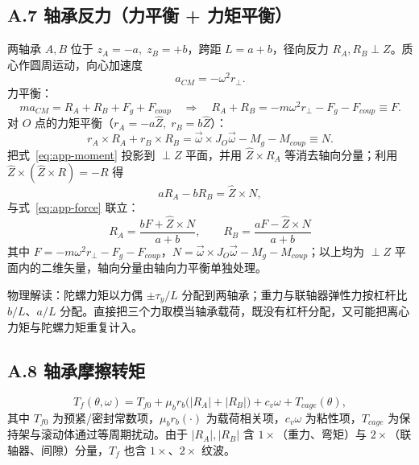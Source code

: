 \subsection*{A.7 轴承反力（力平衡 + 力矩平衡）}

两轴承 $A,B$ 位于 $z_A=-a,\;z_B=+b$，跨距 $L=a+b$，径向反力 $R_A,R_B\perp Z$。质心作圆周运动，向心加速度
\begin{equation}
a_{CM}=-\omega^2r_\perp .
\end{equation}
力平衡：
\begin{equation}
m a_{CM}=R_A+R_B+F_g+F_{coup}
\quad\Longrightarrow\quad
R_A+R_B=-m\omega^2r_\perp-F_g-F_{coup}\equiv F .
\label{eq:app-force}
\end{equation}
对 $O$ 点的力矩平衡（$r_A=-a\hat Z,\;r_B=b\hat Z$）：
\begin{equation}
r_A\times R_A+r_B\times R_B
=\vec\omega\times J_O\vec\omega-M_g-M_{coup}\equiv N .
\label{eq:app-moment}
\end{equation}
把式~\eqref{eq:app-moment} 投影到 $\perp Z$ 平面，并用 $\hat Z\times R_A$ 等消去轴向分量；利用 $\hat Z\times(\hat Z\times R)=-R$ 得
\begin{equation}
aR_A-bR_B=\hat Z\times N ,
\end{equation}
与式~\eqref{eq:app-force} 联立：
\begin{equation}
\boxed{\;R_A=\frac{bF+\hat Z\times N}{a+b},\qquad
R_B=\frac{aF-\hat Z\times N}{a+b}\;}
\label{eq:app-RA}
\end{equation}
其中 $F=-m\omega^2r_\perp-F_g-F_{coup}$，$N=\vec\omega\times J_O\vec\omega-M_g-M_{coup}$；以上均为 $\perp Z$ 平面内的二维矢量，轴向分量由轴向力平衡单独处理。

物理解读：陀螺力矩以力偶 $\pm\tau_y/L$ 分配到两轴承；重力与联轴器弹性力按杠杆比 $b/L$、$a/L$ 分配。直接把三个力取模当轴承载荷，既没有杠杆分配，又可能把离心力矩与陀螺力矩重复计入。

\subsection*{A.8 轴承摩擦转矩}

\begin{equation}
T_f(\theta,\omega)=T_{f0}+\mu_b r_b\bigl(|R_A|+|R_B|\bigr)+c_v\omega+T_{cage}(\theta),
\label{eq:app-Tf}
\end{equation}
其中 $T_{f0}$ 为预紧/密封常数项，$\mu_b r_b(\cdot)$ 为载荷相关项，$c_v\omega$ 为粘性项，$T_{cage}$ 为保持架与滚动体通过等周期扰动。由于 $|R_A|,|R_B|$ 含 $1\times$（重力、弯矩）与 $2\times$（联轴器、间隙）分量，$T_f$ 也含 $1\times$、$2\times$ 纹波。

